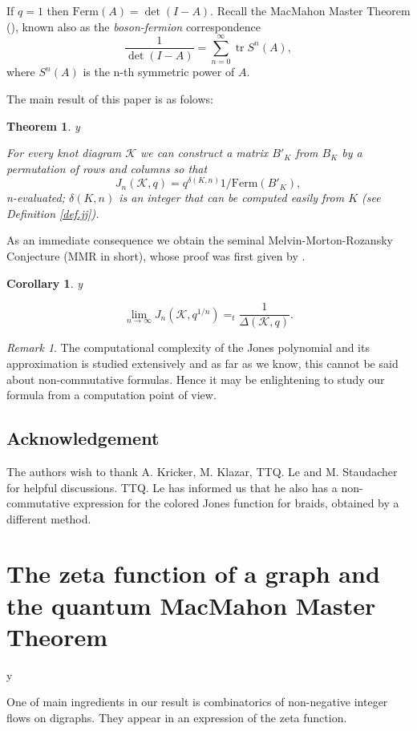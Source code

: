 \documentclass{amsart}
\theoremstyle{plain}
\newtheorem{theorem}{Theorem}
\newtheorem{corollary}[proposition]{Corollary}
\theoremstyle{definition}
\theoremstyle{remark}
\newtheorem{remark}[proposition]{Remark}
\def\printname#1{
        \if\draft y
                \smash{\makebox[0pt]{\hspace{-0.5in}
                        \raisebox{8pt}{\tt\tiny #1}}}
        \fi
}
\newcommand{\tr}{\operatorname{tr}}
\def\lbl#1{\label{#1}\printname{#1}}
\def\D{\Delta}
\def\K{\mathcal K}
\def\d{\delta}
\def\Ferm{\mathrm{Ferm}}
\begin{document}
If $q=1$ then $\Ferm(A)= \det(I-A)$. Recall the MacMahon Master Theorem 
(\cite{MMM}),
known also as the {\em boson-fermion} correspondence 
$$
\frac{1}{\det(I-A)}= \sum_{n=0}^{\infty} \tr S^n(A),
$$
where $S^n(A)$ is the n-th symmetric power of $A$.

The main result of this paper is as folows:

\begin{theorem}
\lbl{thm.nonc}
For every knot diagram $\K$ we can construct a matrix $B'_K$ from $B_K$
by a permutation of rows and columns so that 
$$
J_n(\K,q) = q^{\d(K,n)}1/\Ferm(B'_K),
$$
n-evaluated; $\d(K,n)$ is an integer that can be computed easily from $K$ 
(see Definition
\ref{def.jj}). 
\end{theorem}



As an immediate consequence we obtain the seminal Melvin-Morton-Rozansky 
Conjecture (MMR in short),
whose proof was first given by \cite{BG}.

\begin{corollary}
\lbl{cor.MMR}
$$
\lim_{n \to \infty} J_n(\K,q^{1/n})=_t \frac{1}{\D(\K,q)}.
$$
\end{corollary}

\begin{remark}
The computational complexity of the Jones polynomial and its approximation
is studied extensively and as far as we know, this cannot be said about 
non-commutative formulas. Hence it may be enlightening to study our formula
from a computation point of view.
\end{remark}

\subsection{Acknowledgement} The authors wish to thank A. Kricker, 
M. Klazar, TTQ. Le and M. Staudacher for helpful discussions.
TTQ. Le has informed us that he also has a non-commutative expression
for the colored Jones function for braids, obtained by a different method. 

\section{The zeta function of a graph and the quantum MacMahon Master Theorem}
\lbl{sec.zeta}

One of main ingredients in our result is combinatorics of non-negative
integer flows on digraphs. They appear in an expression of the zeta function.
\end{document}
